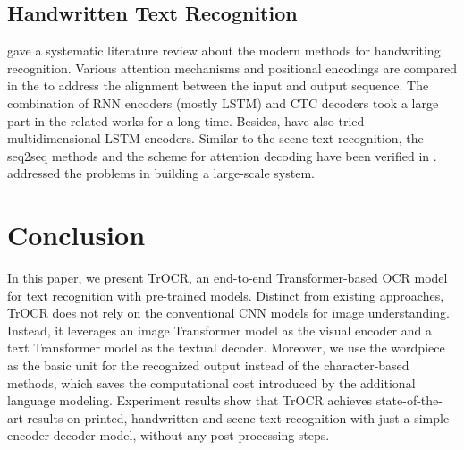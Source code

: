 \documentclass[letterpaper]{article} \usepackage{aaai23}  \usepackage{times}  \usepackage{helvet}  \usepackage{courier}  \usepackage[hyphens]{url}  \usepackage{graphicx} \urlstyle{rm} \def\UrlFont{\rm}  \usepackage{natbib}  \usepackage{caption} \frenchspacing  \setlength{\pdfpagewidth}{8.5in} \setlength{\pdfpageheight}{11in} \usepackage{algorithm}
\begin{document}
\subsection{Handwritten Text Recognition}
\cite{memon2020handwritten} gave a systematic literature review about the modern methods for handwriting recognition. Various attention mechanisms and positional encodings are compared in the \cite{michael2019evaluating} to address the alignment between the input and output sequence. The combination of RNN encoders (mostly LSTM) and CTC decoders \cite{bluche2017gated, graves2008offline, pham2014dropout} took a large part in the related works for a long time. Besides, \cite{graves2008offline, voigtlaender2016handwriting, puigcerver2017multidimensional} have also tried multidimensional LSTM encoders. Similar to the scene text recognition, the seq2seq methods and the scheme for attention decoding have been verified in \cite{michael2019evaluating, kang2020pay, chowdhury2018efficient, bluche2016joint}. \cite{ingle2019scalable} addressed the problems in building a large-scale system.


\section{Conclusion}

In this paper, we present TrOCR, an end-to-end Transformer-based OCR model for text recognition with pre-trained models. Distinct from existing approaches, TrOCR does not rely on the conventional CNN models for image understanding. Instead, it leverages an image Transformer model as the visual encoder and a text Transformer model as the textual decoder. Moreover, we use the wordpiece as the basic unit for the recognized output instead of the character-based methods, which saves the computational cost introduced by the additional language modeling. Experiment results show that TrOCR achieves state-of-the-art results on printed, handwritten and scene text recognition with just a simple encoder-decoder model, without any post-processing steps. 




\end{document}
